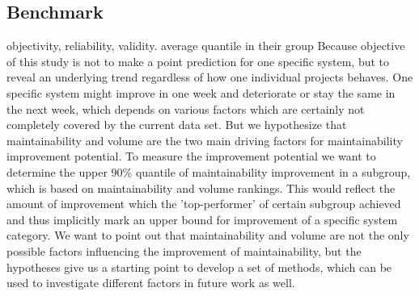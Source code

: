 \subsection{Benchmark}
objectivity, reliability, validity.
average quantile in their group
Because objective of this study is not to make a point prediction for one specific system, but to reveal an underlying trend regardless of how one individual projects behaves. One specific system might improve in one week and deteriorate or stay the same in the next week, which depends on various factors which are certainly not completely covered by the current data set. But we hypothesize that maintainability and volume are the two main driving factors for maintainability improvement potential. To measure the improvement potential we want to determine the upper 90\% quantile of maintainability improvement in a subgroup, which is based on maintainability and volume rankings. This would reflect the amount of improvement which the 'top-performer' of certain subgroup achieved and thus implicitly mark an upper bound for improvement of a specific system category. We want to point out that maintainability and volume are not the only possible factors influencing the improvement of maintainability, but the hypotheses give us a starting point to develop a set of methods, which can be used to investigate different factors in future work as well.

